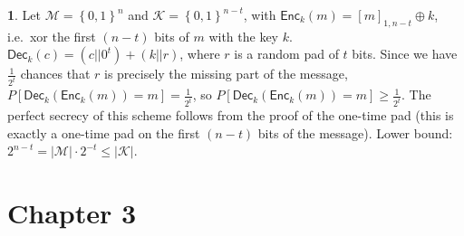 \documentclass{article}
\theoremstyle{definition}
\newcommand{\set}[1]{\left\{#1\right\}}
\newcommand{\abs}[1]{\left|#1\right|}
\newcommand{\Enc}{\mathsf{Enc}}
\newcommand{\Dec}{\mathsf{Dec}}
\newcommand{\Ms}{\mathcal{M}} %
\newcommand{\Ks}{\mathcal{K}} %
\theoremstyle{definition}
\theoremstyle{definition}
\newtheorem{solution-internal}{}[subsection]
\newenvironment{solution}{
  \begin{solution-internal}
}{
  \end{solution-internal}
}
\begin{document}
\begin{solution}
  Let $\Ms = \set{0,1}^n$ and $\Ks = \set{0,1}^{n-t}$, with $\Enc_k(m) = [m]_{1,
  n-t} \oplus k$, i.e.\ xor the first $(n-t)$ bits of $m$ with the key $k$.
  $\Dec_k(c) = (c || 0^t) \plus (k || r)$, where $r$ is a random pad of $t$
  bits. Since we have $\frac{1}{2^t}$ chances that $r$ is precisely the missing
  part of the message, $P[\Dec_k(\Enc_k(m)) = m] = \frac{1}{2^t}$, so 
  $P[\Dec_k(\Enc_k(m)) = m] \geqslant \frac{1}{2^t}$. The perfect secrecy of
  this scheme follows from the proof of the one-time pad (this is exactly a
  one-time pad on the first $(n-t)$ bits of the message). Lower bound: $2^{n-t}
  = \abs{\Ms}\cdot 2^{-t} \leqslant \abs{\Ks}$.
\end{solution}

\section*{Chapter 3}
\setcounter{subsection}{3}
\setcounter{solution-internal}{0}
\end{document}
